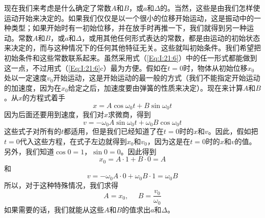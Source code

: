 现在我们来考虑是什么确定了常数$A$和$B$，或$a$和$\Delta$的。当然，这些是由我们怎样使运动开始来决定的。如果我们仅仅是以一个很小的位移开始运动，这是振动中的一种类型；如果开始时有一初始位移，并在放手时再推一下，我们就得到另一种运动。常数$A$和$B$，或$a$和$\Delta$，或用其他任何形式表达的常数，都是由运动的初始状态来决定的，而与这种情况下的任何其他特征无关。这些就叫初始条件。我们希望把初始条件和这些常数联系起来。虽然采用式（\ref{Eq:I:21:6}）中的任一形式都能做到这一点，不过用式（\ref{Eq:I:21:6}c）最为方便。假如在$t=0$时，物体从初始位移$x_0$处以一定速度$v_0$开始运动，这是开始运动的最一般的方式（我们不能指定开始运动的加速度，因为在$x_0$给定之后，加速度要由弹簧的性质来决定）。现在来计算$A$和$B$。从$x$的方程式着手
\begin{equation*}
    x=A\cos\omega_0t+B\sin\omega_0t
\end{equation*}
因为后面还要用到速度，我们对$x$求微商，得到
\begin{equation*}
    v=-\omega_0A\sin\omega_0t+\omega_0B\cos\omega_0t
\end{equation*}
这些式子对所有的$t$都适用，但是我们已经知道了在$t=0$时的$x$和$v$。因此，假如把$t=0$代入这些方程，在式子左边就得到$x_0$和$v_0$，因为这是在$t=0$时的$x$和$v$的值。另外，我们知道$\cos 0=1$，$\sin 0=0$。因此得到
\begin{equation*}
    x_0 = A \cdot 1 + B \cdot 0 = A
\end{equation*}
和
\begin{equation*}
    v=-\omega_0A \cdot 0+\omega_0B \cdot 1 = \omega_0 B
\end{equation*}
所以，对于这种特殊情况，我们求得
\begin{equation*}
    A=x_0,~~~~~~B=\frac{v_0}{\omega_0}
\end{equation*}
如果需要的话，我们就能从这些$A$和$B$的值求出$a$和$\Delta$。

